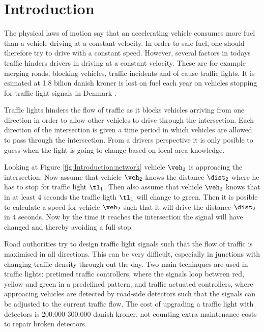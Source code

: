 \section{Introduction}

The physical laws of motion say that an accelerating vehicle consumes more fuel than a vehicle driving at a constant velocity.\cite{Vejdir}
In order to safe fuel, one should therefore try to drive with a constant speed. 
However, several factors in todays traffic hinders drivers in driving at a constant velocity. 
These are for example merging roads, blocking vehicles, traffic incidents and of cause traffic lights. 
It is esimated at 1.8 bilion danish kroner is lost on fuel each year on vehicles stopping for traffic light signals in Denmark \cite{Vejdir}.

Traffic lights hinders the flow of traffic as it blocks vehicles arriving from one direction in order to allow other vehicles to drive through the intersection.
Each direction of the intersection is given a time period in which vehicles are allowed to pass through the intersection. 
From a drivers perspective it is only posible to guess when the light is going to change based on local area knowledge. 

Looking at Figure \ref{fig:Introduction:network} vehicle $\veh_2$ is approacing the intersection.
Now assume that vehicle $\veh_2$ knows the distance $\dist_2$ where he has to stop for traffic light $\tl_1$. 
Then also assume that vehicle $\veh_2$ knows that in at least $4$ seconds the traffic ligth $\tl_1$ will change to green. 
Then it is posible to calculate a speed for vehicle $\veh_2$ such that it will drive the distance $\dist_2$ in $4$ seconds. 
Now by the time it reaches the intersection the signal will have changed and thereby avoiding a full stop.


Road authorities try to design traffic light signals such that the flow of traffic is maximised in all directions.
This can be very difficult, especially in junctions with changing traffic density through out the day.
Two main techinques are used in traffic lights: pretimed traffic controllers, where the signals loop between red, yellow and green in a predefined pattern; and traffic actuated controllers, where approacing vehicles are detected by road-side detectors such that the signals can be adjusted to the current traffic flow. The cost of upgrading a traffic light with detectors is 200.000-300.000 danish kroner, not counting extra maintenance costs to repair broken detectors\cite{Vejdir}.


